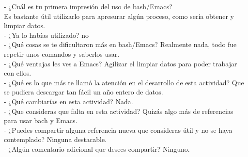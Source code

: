 \documentclass{article}
\begin{document}
\noindent	
- ¿Cuál es tu primera impresión del uso de bash/Emacs?\\
Es bastante útil utilizarlo para apresurar algún proceso, como sería obtener y limpiar datos.\\
\newline
- ¿Ya lo habías utilizado? no\\
\newline
- ¿Qué cosas se te dificultaron más en bash/Emacs? 
Realmente nada, todo fue repetir unos comandos y saberlos usar.\\ 
\newline
- ¿Qué ventajas les ves a Emacs? Agilizar el limpiar datos para poder trabajar con ellos. \\
\newline
- ¿Qué es lo que más te llamó la atención en el desarrollo de esta actividad? Que se pudiera descargar tan fácil un año entero de datos.\\
\newline
- ¿Qué cambiarías en esta actividad? Nada.\\
\newline
- ¿Que consideras que falta en esta actividad? Quizás algo más de referencias para usar bach y Emacs. \\
\newline
- ¿Puedes compartir alguna referencia nueva que consideras útil y no se haya contemplado? Ninguna destacable. \\
\newline
- ¿Algún comentario adicional que desees compartir? Ninguno. \\
\end{document}

